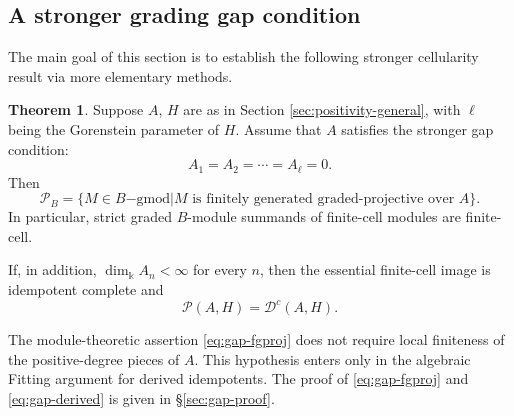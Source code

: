\documentclass[11pt]{article}
\theoremstyle{definition}
\newtheorem{thm}{Theorem}[section]
\newtheorem{rem}[thm]{Remark}
\numberwithin{equation}{section}
\def\udgmod{\mbox{-\underline{gmod}}}
\def\dgmod{\operatorname{-{gmod}}}
\newcommand{\kk}{\Bbbk}
\newcommand{\Pun}{\mathcal{P}_B}
\newcommand{\Tcat}{\mathcal{P}(A,H)}
\newcommand{\Dc}{\mathcal{D}^c(A,H)}
\newcommand{\K}{\operatorname{K}_0}
\newcommand{\OH}{\mathbb{O}_H}
\begin{document}
\subsection{A stronger grading gap condition}
\label{sec:gap-statement}

The main goal of this section is to establish the following stronger cellularity result via more elementary methods.

\begin{thm}
\label{thm:gap-local}
Suppose $A$, $H$ are as in Section \ref{sec:positivity-general}, with $\ell$ being the Gorenstein parameter of $H$. Assume that $A$ satisfies the stronger gap condition:
\begin{equation}\label{eq:gap-local}
 A_1=A_2=\cdots=A_\ell=0.
\end{equation}
Then
\begin{equation}\label{eq:gap-fgproj}
 \Pun=\{M\in B\dgmod |
 M\text{ is finitely generated graded-projective over }A\}.
\end{equation}
In particular, strict graded $B$-module summands of finite-cell modules
are finite-cell.

If, in addition, $\dim_\kk A_n<\infty$ for every $n$, then the essential
finite-cell image is idempotent complete and
\begin{equation}\label{eq:gap-derived}
 \Tcat=\Dc.
\end{equation}
\end{thm}

The module-theoretic assertion \eqref{eq:gap-fgproj} does not require local
finiteness of the positive-degree pieces of $A$.  This hypothesis enters
only in the algebraic Fitting argument for derived idempotents.
The proof of \eqref{eq:gap-fgproj} and \eqref{eq:gap-derived} is given in
\S\ref{sec:gap-proof}.

\end{document}
